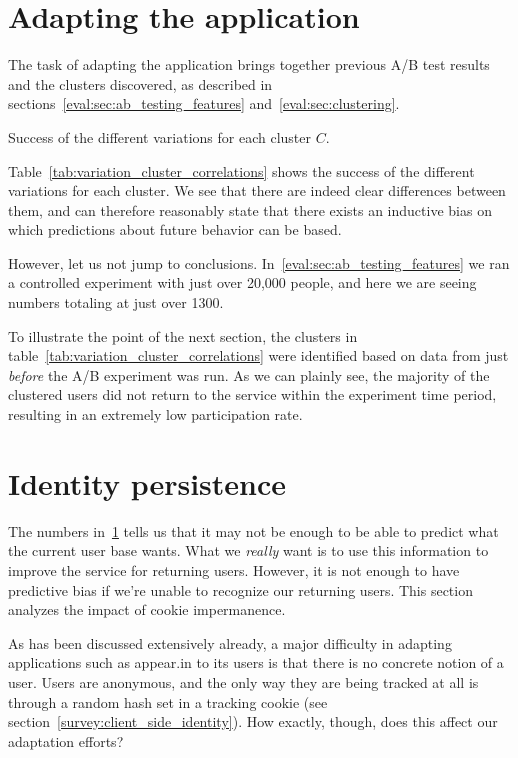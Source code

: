 \section{Adapting the application} %
\label{eval:sec:adapting_the_application}

The task of adapting the application brings together previous A/B test results and the clusters discovered, as described in sections~\ref{eval:sec:ab_testing_features} and~\ref{eval:sec:clustering}.

\begin{table}[h]
  \centering
  
  \caption{Success of the different variations for each cluster $C$.}
  \label{tab:variation_cluster_correlations}
\end{table}

Table~\ref{tab:variation_cluster_correlations} shows the success of the different variations for each cluster. We see that there are indeed clear differences between them, and can therefore reasonably state that there exists an inductive bias on which predictions about future behavior can be based.

However, let us not jump to conclusions. In~\ref{eval:sec:ab_testing_features} we ran a controlled experiment with just over 20,000 people, and here we are seeing numbers totaling at just over 1300.

To illustrate the point of the next section, the clusters in table~\ref{tab:variation_cluster_correlations} were identified based on data from just \emph{before} the A/B experiment was run. As we can plainly see, the majority of the clustered users did not return to the service within the experiment time period, resulting in an extremely low participation rate.

\section{Identity persistence}
\label{eval:sec:identity_persistence}

The numbers in~\ref{eval:sec:adapting_the_application} tells us that it may not be enough to be able to predict what the current user base wants. What we \emph{really} want is to use this information to improve the service for returning users. However, it is not enough to have predictive bias if we're unable to recognize our returning users. This section analyzes the impact of cookie impermanence.

As has been discussed extensively already, a major difficulty in adapting applications such as appear.in to its users is that there is no concrete notion of a user. Users are anonymous, and the only way they are being tracked at all is through a random hash set in a tracking cookie (see section~\ref{survey:client_side_identity}). How exactly, though, does this affect our adaptation efforts?

